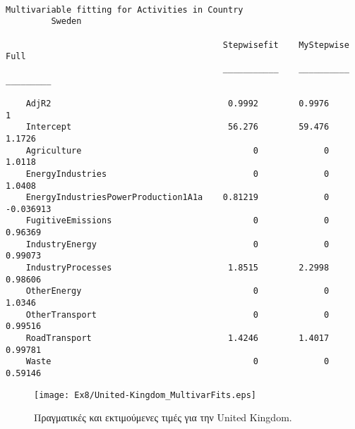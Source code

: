 \documentclass[11pt]{scrartcl} %
\begin{document}
\begin{Verbatim}[fontsize=\small]

Multivariable fitting for Activities in Country
 	 	 Sweden

                                           Stepwisefit    MyStepwise      Full   
                                           ___________    __________    _________

    AdjR2                                   0.9992        0.9976                1
    Intercept                               56.276        59.476           1.1726
    Agriculture                                  0             0           1.0118
    EnergyIndustries                             0             0           1.0408
    EnergyIndustriesPowerProduction1A1a    0.81219             0        -0.036913
    FugitiveEmissions                            0             0          0.96369
    IndustryEnergy                               0             0          0.99073
    IndustryProcesses                       1.8515        2.2998          0.98606
    OtherEnergy                                  0             0           1.0346
    OtherTransport                               0             0          0.99516
    RoadTransport                           1.4246        1.4017          0.99781
    Waste                                        0             0          0.59146
\end{Verbatim}



\begin{figure}[H]
 
	\centering
	\texttt{[image: Ex8/United-Kingdom\_MultivarFits.eps]}	
\caption{Πραγματικές και εκτιμούμενες τιμές για την United Kingdom.}
\label{fig:z815}
\end{figure}
\end{document}
